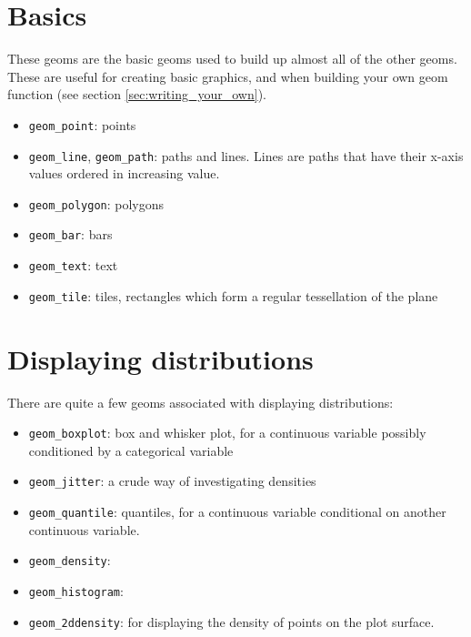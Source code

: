 \section{Basics}\label{sub:basics}

These geoms are the basic geoms used to build up almost all of the other geoms.  These are useful for creating basic graphics, and when building your own geom function (see section \ref{sec:writing_your_own}).

\begin{itemize}
  \item {\tt geom\_point}: points
  \item {\tt geom\_line}, {\tt geom\_path}: paths and lines.  Lines are paths that have their x-axis values ordered in increasing value.
  \item {\tt geom\_polygon}: polygons
  \item {\tt geom\_bar}: bars
  \item {\tt geom\_text}: text
  \item {\tt geom\_tile}: tiles, rectangles which form a regular tessellation of the plane
\end{itemize}

\section{Displaying distributions}\label{sec:distributions}

There are quite a few geoms associated with displaying distributions:

\begin{itemize}
	\item {\tt geom\_boxplot}: box and whisker plot, for a continuous variable possibly conditioned by a categorical variable
	\item {\tt geom\_jitter}: a crude way of investigating densities
	\item {\tt geom\_quantile}: quantiles, for a continuous variable conditional on another continuous variable.
	\item {\tt geom\_density}: 
	\item {\tt geom\_histogram}: 
	\item {\tt geom\_2ddensity}: for displaying the density of points on the plot surface.
\end{itemize}

% 
% 
%   
% 
% 

